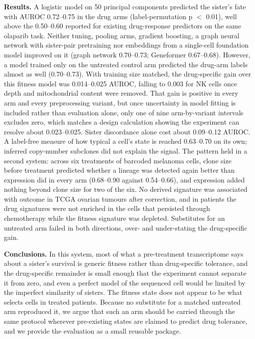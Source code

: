 \documentclass[11pt,a4paper]{article}
\begin{document}
\textbf{Results.} A logistic model on 50 principal components predicted the sister's fate with AUROC 0.72--0.75 in the drug arms (label-permutation p $<$ 0.01), well above the 0.50--0.60 reported for existing drug-response predictors on the same olaparib task. Neither tuning, pooling arms, gradient boosting, a graph neural network with sister-pair pretraining nor embeddings from a single-cell foundation model improved on it (graph network 0.70--0.73; Geneformer 0.67--0.68). However, a model trained only on the untreated control arm predicted the drug-arm labels almost as well (0.70--0.73). With training size matched, the drug-specific gain over this fitness model was 0.014--0.025 AUROC, falling to 0.003 for NK cells once depth and mitochondrial content were removed. That gain is positive in every arm and every preprocessing variant, but once uncertainty in model fitting is included rather than evaluation alone, only one of nine arm-by-variant intervals excludes zero, which matches a design calculation showing the experiment can resolve about 0.023--0.025. Sister discordance alone cost about 0.09--0.12 AUROC. A label-free measure of how typical a cell's state is reached 0.63--0.70 on its own; inferred copy-number subclones did not explain the signal. The pattern held in a second system: across six treatments of barcoded melanoma cells, clone size before treatment predicted whether a lineage was detected again better than expression did in every arm (0.68--0.90 against 0.54--0.66), and expression added nothing beyond clone size for two of the six. No derived signature was associated with outcome in TCGA ovarian tumours after correction, and in patients the drug signatures were not enriched in the cells that persisted through chemotherapy while the fitness signature was depleted. Substitutes for an untreated arm failed in both directions, over- and under-stating the drug-specific gain.

\textbf{Conclusions.} In this system, most of what a pre-treatment transcriptome says about a sister's survival is generic fitness rather than drug-specific tolerance, and the drug-specific remainder is small enough that the experiment cannot separate it from zero, and even a perfect model of the sequenced cell would be limited by the imperfect similarity of sisters. The fitness state does not appear to be what selects cells in treated patients. Because no substitute for a matched untreated arm reproduced it, we argue that such an arm should be carried through the same protocol wherever pre-existing states are claimed to predict drug tolerance, and we provide the evaluation as a small reusable package.
\end{document}
